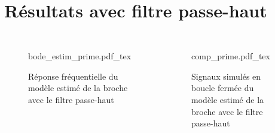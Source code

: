 \documentclass{style/presentation}
\begin{document}
\section{Résultats avec filtre passe-haut}
\begin{frame}
    \begin{columns}
        \begin{figure}
            \centering
            {\fontsize{4.5pt}{5pt}\selectfont
                \def\svgwidth{\textwidth}
                {bode_estim_prime.pdf_tex}}
            \caption{Réponse fréquentielle du modèle estimé de la broche avec le filtre passe-haut}
        \end{figure}

        \begin{figure}
            \centering
            {\fontsize{4.5pt}{5pt}\selectfont
                \def\svgwidth{\textwidth}
                {comp_prime.pdf_tex}}
            \caption{Signaux simulés en boucle fermée du modèle estimé de la broche avec le filtre passe-haut}
        \end{figure}
    \end{columns}
\end{frame}
\end{document}
